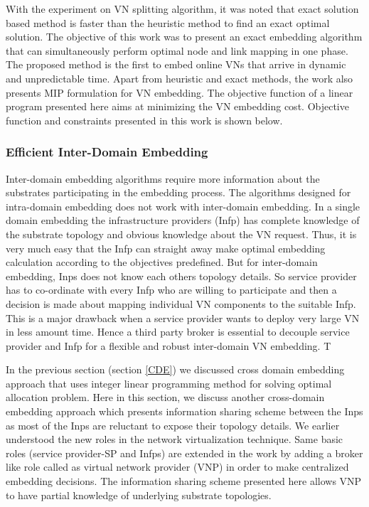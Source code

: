 \documentclass[article,dr=phil,type=msc ,colorback,accentcolor=tud4b]{tudthesis}
\begin{document}
With the experiment on VN splitting algorithm, it was noted that exact solution based method is faster than the heuristic method to find an exact optimal solution. The objective of this work was to present an exact embedding algorithm that can simultaneously perform optimal node and link mapping in one phase. The proposed method is the first to embed online VNs that arrive in dynamic and unpredictable time. Apart from heuristic and exact methods, the work also presents MIP formulation for VN embedding. The objective function of a linear program presented here aims at minimizing the VN embedding cost. Objective function and constraints presented in this work is shown below.

\newpage
\subsubsection{Efficient Inter-Domain Embedding} \label{inter-domain}
Inter-domain embedding algorithms require more information about the substrates participating in the embedding process. The algorithms designed for intra-domain embedding does not work with inter-domain embedding. In a single domain embedding the infrastructure providers (Infp) has complete knowledge of the substrate topology and obvious knowledge about the VN request. Thus, it is very much easy that the Infp can straight away make optimal embedding calculation according to the objectives predefined. But for inter-domain embedding, Inps does not know each others topology details. So service provider has to co-ordinate with every Infp who are willing to participate and then a decision is made about mapping individual VN components to the suitable Infp. This is a major drawback when a service provider wants to deploy very large VN in less amount time. Hence a third party broker is essential to decouple service provider and Infp for a flexible and robust inter-domain VN embedding.  T\newline

In the previous section (section \ref{CDE}) we discussed cross domain embedding approach that uses integer linear programming method for solving optimal allocation problem. Here in this section, we discuss another cross-domain embedding approach which presents information sharing scheme between the Inps as most of the Inps are reluctant to expose their topology details. We earlier understood the new roles in the network virtualization technique. Same basic roles (service provider-SP and Infps) are extended in the work \cite{6914301} by adding a broker like role called as virtual network provider (VNP) in order to make centralized embedding decisions. The information sharing scheme presented here allows VNP to have partial knowledge of underlying substrate topologies. \newline
\end{document}
